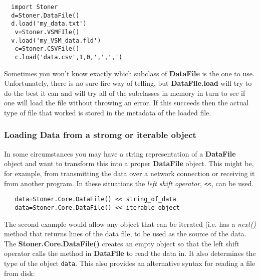 \documentclass[a4paper,11pt]{scrartcl}
\begin{document}
\begin{lstlisting}
  import Stoner
  d=Stoner.DataFile()
  d.load('my_data.txt')
   v=Stoner.VSMFIle()
  v.load('my_VSM_data.fld')
   c=Stoner.CSVFile()
   c.load('data.csv',1,0,',',',')
\end{lstlisting}


Sometimes you won't know exactly which subclass of \textbf{DataFile} is the one to use. Unfortunately, there is no sure fire way of telling, but \textbf{DataFile.load} will try to do the best it can and will try all of the subclasses in memory in turn to see if one will load the file without throwing an error. If this succeeds then the actual type of file that worked is stored in the metadata of the loaded file.


\subsubsection{Loading Data from a stromg or iterable object}

In some circumstances you may have a string representation of a \textbf{DataFile} object and want to transform this into a proper \textbf{DataFile} object.
This might be, for example, from transmitting the data over a network connection or receiving it from another program. In these situations the \textit{left shift operator}, \verb#<<#, can be used.

\begin{lstlisting}
   data=Stoner.Core.DataFile() << string_of_data
   data=Stoner.Core.DataFile() << iterable_object
\end{lstlisting}

The second example would allow any object that can be iterated (i.e. has a \textit{next()} method that returns lines of the data file, to be used
as the source of the data. The \textbf{Stoner.Core.DataFile()} creates an empty object so that the left shift operator calls the method
in \textbf{DataFile} to read the data in. It also determines the type of the object \verb#data#. This also provides an alternative syntax for reading a file
from disk:
\end{document}
